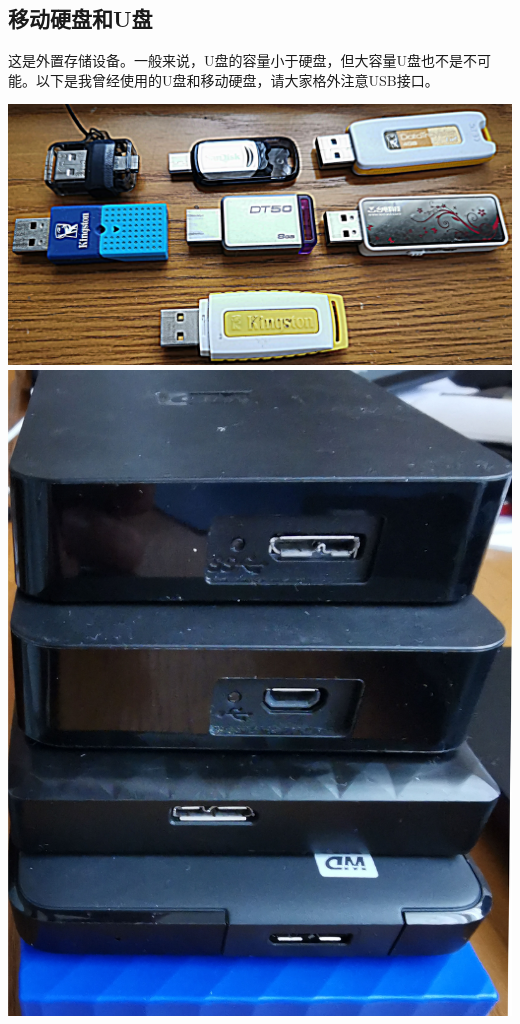 \subsection{移动硬盘和U盘}
这是外置存储设备。一般来说，U盘的容量小于硬盘，但大容量U盘也不是不可能。以下是我曾经使用的U盘和移动硬盘，请大家格外注意USB接口。
\begin{center}
\includegraphics[scale=0.1]{pic/FlashDisk1}	\\\includegraphics[scale=0.1]{pic/FlashDisk2}
\end{center} \par
